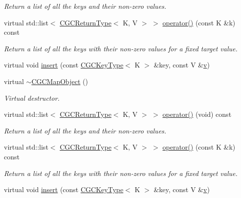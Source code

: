 \begin{DoxyCompactItemize}
\begin{DoxyCompactList}\small\item\em Return a list of all the keys and their non-\/zero values. \end{DoxyCompactList}\item 
virtual std\+::list$<$ \mbox{\hyperlink{structHadron_1_1CGCReturnType}{C\+G\+C\+Return\+Type}}$<$ K, V $>$ $>$ \mbox{\hyperlink{classHadron_1_1CGCMapObject_aeb342dc81f17743a25b969f540db4edf}{operator()}} (const K \&k) const
\begin{DoxyCompactList}\small\item\em Return a list of all the keys with their non-\/zero values for a fixed target value. \end{DoxyCompactList}\item 
virtual void \mbox{\hyperlink{classHadron_1_1CGCMapObject_a334a88a21755a64719b1081190d2bde2}{insert}} (const \mbox{\hyperlink{structHadron_1_1CGCKeyType}{C\+G\+C\+Key\+Type}}$<$ K $>$ \&key, const V \&\mbox{\hyperlink{adat__devel_2lib_2hadron_2hadron__timeslice_8cc_a716fc87f5e814be3ceee2405ed6ff22a}{v}})
\item 
virtual \mbox{\hyperlink{classHadron_1_1CGCMapObject_aee79d26f143bad748680b674763b831f}{$\sim$\+C\+G\+C\+Map\+Object}} ()
\begin{DoxyCompactList}\small\item\em Virtual destructor. \end{DoxyCompactList}\item 
virtual std\+::list$<$ \mbox{\hyperlink{structHadron_1_1CGCReturnType}{C\+G\+C\+Return\+Type}}$<$ K, V $>$ $>$ \mbox{\hyperlink{classHadron_1_1CGCMapObject_aaa4b18e1a2845e16154cd434462c0779}{operator()}} (void) const
\begin{DoxyCompactList}\small\item\em Return a list of all the keys and their non-\/zero values. \end{DoxyCompactList}\item 
virtual std\+::list$<$ \mbox{\hyperlink{structHadron_1_1CGCReturnType}{C\+G\+C\+Return\+Type}}$<$ K, V $>$ $>$ \mbox{\hyperlink{classHadron_1_1CGCMapObject_aeb342dc81f17743a25b969f540db4edf}{operator()}} (const K \&k) const
\begin{DoxyCompactList}\small\item\em Return a list of all the keys with their non-\/zero values for a fixed target value. \end{DoxyCompactList}\item 
virtual void \mbox{\hyperlink{classHadron_1_1CGCMapObject_a334a88a21755a64719b1081190d2bde2}{insert}} (const \mbox{\hyperlink{structHadron_1_1CGCKeyType}{C\+G\+C\+Key\+Type}}$<$ K $>$ \&key, const V \&\mbox{\hyperlink{adat__devel_2lib_2hadron_2hadron__timeslice_8cc_a716fc87f5e814be3ceee2405ed6ff22a}{v}})
\end{DoxyCompactItemize}


